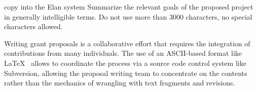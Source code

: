 \begin{Summary}
  \begin{todo}{copy into the Elan system}
    Summarize the relevant goals of the proposed project in generally intelligible
    terms. Do not use more than 3000 characters, no special characters allowed.
  \end{todo}
  Writing grant proposals is a collaborative effort that requires the integration of
  contributions from many individuals. The use of an ASCII-based format like
  {\LaTeX}~\cite{Lamport:ladps94} allows to coordinate the process via a source code
  control system like Subversion, allowing the proposal writing team to concentrate on the
  contents rather than the mechanics of wrangling with text fragments and revisions.
\end{Summary}

